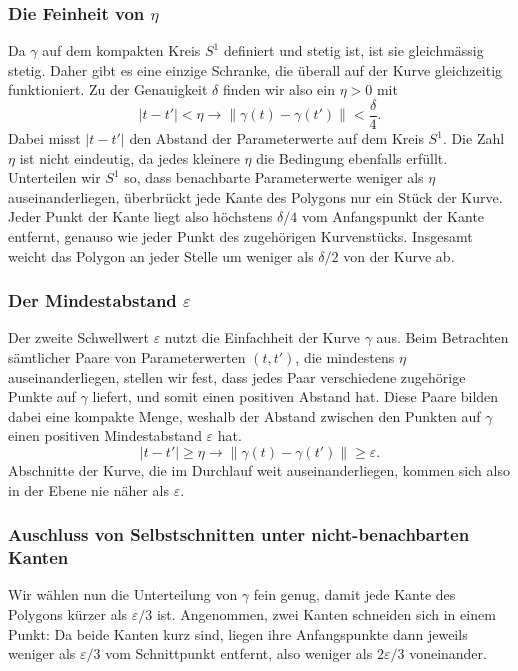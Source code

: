 \subsubsection{Die Feinheit von $\eta$}

Da $\gamma$ auf dem kompakten Kreis $S^1$ definiert und stetig ist, ist sie gleichmässig stetig.
Daher gibt es eine einzige Schranke, die überall auf der Kurve gleichzeitig funktioniert.
Zu der Genauigkeit $\delta$ finden wir also ein $\eta > 0$ mit
\[
    |t - t'| < \eta \rightarrow \|\gamma(t) - \gamma(t')\| < \frac{\delta}{4}.
\]
Dabei misst $|t - t'|$ den Abstand der Parameterwerte auf dem Kreis $S^1$. 
Die Zahl $\eta$ ist nicht eindeutig, da jedes kleinere $\eta$ die Bedingung ebenfalls erfüllt.
Unterteilen wir $S^1$ so, dass benachbarte Parameterwerte weniger als $\eta$ auseinanderliegen, überbrückt jede Kante des Polygons nur ein Stück der Kurve.
Jeder Punkt der Kante liegt also höchstens $\delta/4$ vom Anfangspunkt der Kante entfernt, genauso wie jeder Punkt des zugehörigen Kurvenstücks.
Insgesamt weicht das Polygon an jeder Stelle um weniger als $\delta / 2$ von der Kurve ab.

\subsubsection{Der Mindestabstand $\varepsilon$}

Der zweite Schwellwert $\varepsilon$ nutzt die Einfachheit der Kurve $\gamma$ aus.
Beim Betrachten sämtlicher Paare von Parameterwerten $(t, t')$, die mindestens $\eta$ auseinanderliegen, stellen wir fest, dass jedes Paar verschiedene zugehörige Punkte auf $\gamma$ liefert, und somit einen positiven Abstand hat.
Diese Paare bilden dabei eine kompakte Menge, weshalb der Abstand zwischen den Punkten auf $\gamma$ einen positiven Mindestabstand $\varepsilon$ hat.
\[
  |t - t'| \ge \eta \rightarrow \|\gamma(t) - \gamma(t')\| \ge \varepsilon .
\]
Abschnitte der Kurve, die im Durchlauf weit auseinanderliegen, kommen sich also in der Ebene nie näher als $\varepsilon$.

\subsubsection{Auschluss von Selbstschnitten unter nicht-benachbarten Kanten}

Wir wählen nun die Unterteilung von $\gamma$ fein genug, damit jede Kante des Polygons kürzer als $\varepsilon / 3$ ist.
Angenommen, zwei Kanten schneiden sich in einem Punkt: Da beide Kanten kurz sind, liegen ihre Anfangspunkte dann jeweils weniger als $\varepsilon / 3$ vom Schnittpunkt entfernt, also weniger als $2 \varepsilon / 3$ voneinander.

